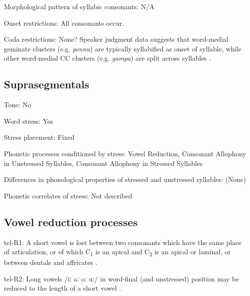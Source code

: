 {\begin{appendixdesc}
\item[Morphological pattern of syllabic consonants:] N/A

\item[Onset restrictions:] All consonants occur. 

\item[Coda restrictions:] None? Speaker judgment data suggests that word-medial geminate clusters (e.g. \textit{pennu}) are typically syllabified as onset of syllable, while other word-medial CC clusters (e.g. \textit{gampa}) are split across syllables \citep{Sailaja1999}.
\end{appendixdesc}
\subsection*{Suprasegmentals}
\begin{appendixdesc}
\item[Tone:] No

\item[Word stress:] Yes

\item[Stress placement:] Fixed

\item[Phonetic processes conditioned by stress:] Vowel Reduction, Consonant Allophony in Unstressed Syllables, Consonant Allophony in Stressed Syllables

\item[Differences in phonological properties of stressed and unstressed syllables:] (None)

\item[Phonetic correlates of stress:] Not described
\end{appendixdesc}
\subsection*{Vowel reduction processes}
\begin{appendixdesc}

\item[tel-R1:] A short vowel is lost between two consonants which have the same place of articulation, or of which C\textsubscript{1} is an apical and C\textsubscript{2} is an apical or laminal, or between dentals and affricates \citep[9]{KostićEtAl1977}.

\item[tel-R2:] Long vowels /iː aː oː uː/ in word-final (and unstressed) position may be reduced to the length of a short vowel \citep[11--52]{KostićEtAl1977}.


\end{appendixdesc}}
